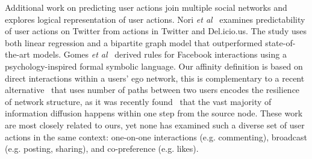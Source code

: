 Additional work on predicting user actions join multiple social networks and explores logical representation of user actions. Nori {\it et al}~\cite{nori2011exploiting} examines predictability of user actions on Twitter from actions in Twitter and Del.icio.us. The study uses both linear regression and a bipartite graph model that outperformed state-of-the-art models. Gomes {\it et al}~\cite{gomes2011social} derived rules for Facebook interactions using a psychology-inspired formal symbolic language. 
Our affinity definition is based on direct interactions within a users' ego network, this is complementary to 
a recent alternative~\cite{Panigrahy2012ubr} that uses number of paths between two users encodes the resilience of network structure, 
as it was recently found~\cite{Goel2012structure} that the vast majority of information diffusion
happens within one step from the source node. 
These work are most closely related to ours, yet none has examined such a diverse set of user actions in the same context: one-on-one interactions (e.g. commenting), broadcast (e.g. posting, sharing), and co-preference (e.g. likes). 





